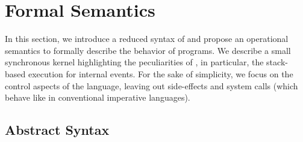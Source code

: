 

\def\JOT{1.5\jot}

\section{Formal Semantics}
\label{sec.sem}

In this section, we introduce a reduced syntax of \CEU and propose an
operational semantics to formally describe the behavior of programs.
We describe a small synchronous kernel highlighting the peculiarities of \CEU,
in particular, the stack-based execution for internal events.
%
For the sake of simplicity, we focus on the control aspects of the language,
leaving out side-effects and system calls (which behave like in conventional
imperative languages).

\subsection{Abstract Syntax}
\label{sec.sem.syntax}


